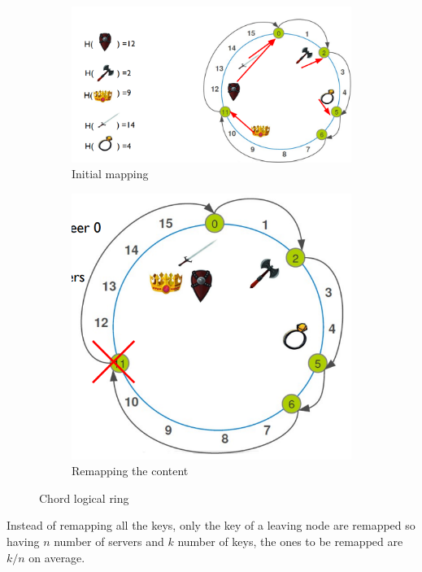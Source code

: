 \documentclass[10pt,a4paper]{report}
\begin{document}
\begin{figure}
	\centering
	\begin{subfigure}{.5\textwidth}
		\centering
		\includegraphics[width=.8\linewidth]{images/Pasted image 20230303114328.png}
		\caption{Initial mapping}
		\label{mapping-content}
	\end{subfigure}%
	\begin{subfigure}{.5\textwidth}
		\centering
		\includegraphics[width=.8\linewidth]{images/Pasted image 20230303114352.png}
		\caption{Remapping the content}
		\label{remapped-ring}
	\end{subfigure}
	\caption{Chord logical ring}
	\label{chord-logical-ring}
\end{figure}



Instead of remapping all the keys, only the key of a leaving node are remapped so having $n$ number of servers and $k$ number of keys, the ones to be remapped are $k/n$ on average.
\end{document}
